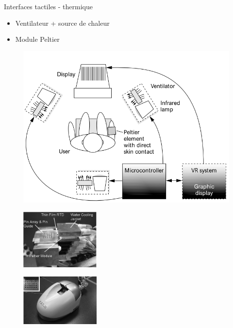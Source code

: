 \documentclass[compress, noflama]{beamer}
\begin{document}
\begin{frame}{Interfaces tactiles - thermique}
\begin{multicols}{2}

\begin{itemize}
\item Ventilateur + source de chaleur
\item Module Peltier
\end{itemize}

\begin{figure}
\centering
\includegraphics[width=\linewidth]{images/thermalFeedback}\caption{\cite{Dionisio1997}}
\end{figure}

\begin{figure}
\centering
\includegraphics[width=4cm]{images/peltier}
\end{figure}

\begin{figure}
\centering
\includegraphics[width=4cm]{images/katII}
\caption{\cite{Yang2008}}
\end{figure}

\end{multicols}
\end{frame}
\end{document}
